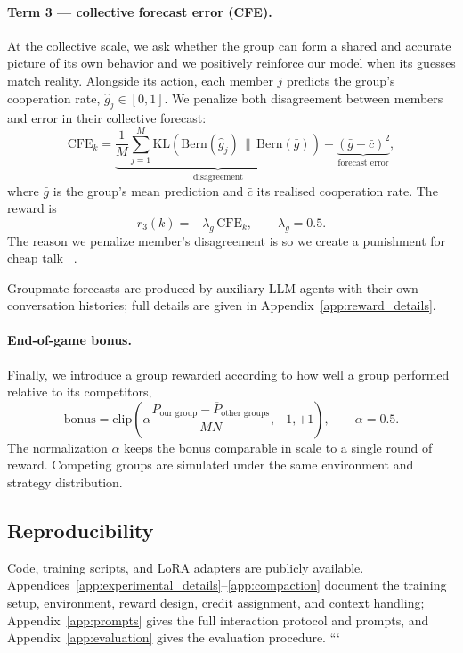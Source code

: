 \documentclass{article}
\begin{document}
\paragraph{Term 3 --- collective forecast error (CFE).}
At the collective scale, we ask whether the group can form a shared and
accurate picture of its own behavior and we positively reinforce our model when its guesses match reality. Alongside its action, each member $j$
predicts the group's cooperation rate, $\hat g_j \in [0,1]$. We penalize both
disagreement between members and error in their collective forecast:
\begin{equation}
\mathrm{CFE}_k =
\underbrace{\frac{1}{M}\sum_{j=1}^{M}
   \mathrm{KL}\!\left(
   \mathrm{Bern}(\hat g_j)\,\|\,\mathrm{Bern}(\bar g)
   \right)}_{\text{disagreement}}
+
\underbrace{(\bar g-\bar c)^2}_{\text{forecast error}},
\label{eq:cfe}
\end{equation}
where $\bar g$ is the group's mean prediction and $\bar c$ its realised
cooperation rate. The reward is
\[
r_3(k)=-\lambda_g\,\mathrm{CFE}_k,
\qquad \lambda_g=0.5.
\]
The reason we penalize member's disagreement is so we create a punishment for cheap talk ~\citep{crawford1982}.

Groupmate forecasts are produced by auxiliary LLM agents with their own
conversation histories; full details are given in
Appendix~\ref{app:reward_details}.

\paragraph{End-of-game bonus.}
Finally, we introduce a group rewarded according to how well a group performed relative to its competitors,
\begin{equation}
\mathrm{bonus}
=
\mathrm{clip}\!\left(
\alpha
\frac{P_{\text{our group}}-\overline{P}_{\text{other groups}}}
     {M N},
-1,+1
\right),
\qquad
\alpha=0.5.
\label{eq:bonus}
\end{equation}
The normalization $\alpha$ keeps the bonus comparable in scale to a single round of
reward. Competing groups are simulated under the same environment and strategy
distribution.

\subsection{Reproducibility}
\label{subsec:repro}

Code, training scripts, and LoRA adapters are publicly available.
Appendices~\ref{app:experimental_details}--\ref{app:compaction} document the
training setup, environment, reward design, credit assignment, and context
handling; Appendix~\ref{app:prompts} gives the full interaction protocol and
prompts, and Appendix~\ref{app:evaluation} gives the evaluation procedure.
```
\end{document}
